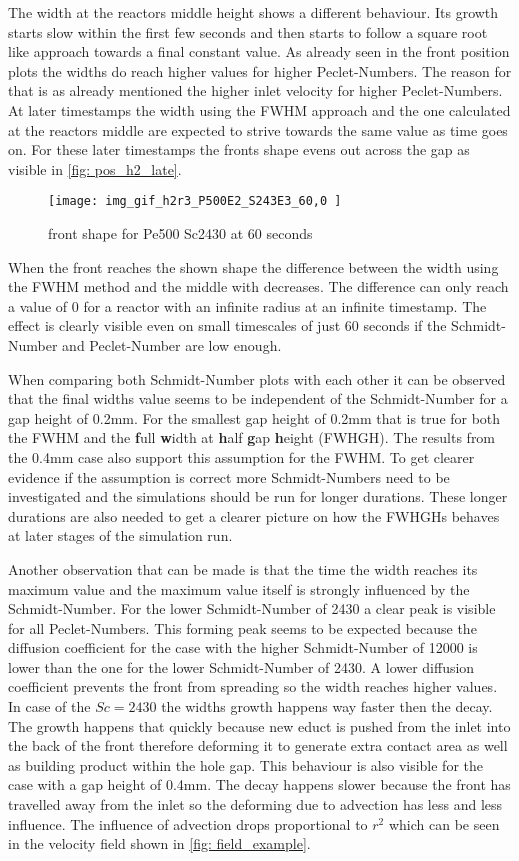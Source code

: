 \documentclass[../thesis.tex]{subfiles}
\begin{document}
The width at the reactors middle height shows a different behaviour. Its growth starts slow within the first few seconds and then starts to follow a square root like approach towards a final constant value. As already seen in the front position plots the widths do reach higher values for higher Peclet-Numbers. The reason for that is as already mentioned the higher inlet velocity for higher Peclet-Numbers. At later timestamps the width using the FWHM approach and the one calculated at the reactors middle are expected to strive towards the same value as time goes on. For these later timestamps the fronts shape evens out across the gap as visible in \autoref{fig: pos_h2_late}.
\begin{figure}[htb]
	\centering
	\texttt{[image: img\_gif\_h2r3\_P500E2\_S243E3\_60,0 ]}
	\caption{front shape for Pe500 Sc2430 at 60 seconds}
	\label{fig: pos_h2_late}
\end{figure}
When the front reaches the shown shape the difference between the width using the FWHM method and the middle with decreases. The difference can only reach a value of 0 for a reactor with an infinite radius at an infinite timestamp. The effect is clearly visible even on small timescales of just 60 seconds if the Schmidt-Number and Peclet-Number are low enough.

When comparing both Schmidt-Number plots with each other it can be observed that the final widths value seems to be independent of the Schmidt-Number for a gap height of 0.2mm. For the smallest gap height of 0.2mm that is true for both the FWHM and the \textbf{f}ull \textbf{w}idth at \textbf{h}alf \textbf{g}ap \textbf{h}eight (FWHGH). The results from the 0.4mm case also support this assumption for the FWHM. To get clearer evidence if the assumption is correct more Schmidt-Numbers need to be investigated and the simulations should be run for longer durations. These longer durations are also needed to get a clearer picture on how the FWHGHs behaves at later stages of the simulation run.

Another observation that can be made is that the time the width reaches its maximum value and the maximum value itself is strongly influenced by the Schmidt-Number. For the lower Schmidt-Number of 2430 a clear peak is visible for all Peclet-Numbers. This forming peak seems to be expected because the diffusion coefficient for the case with the higher Schmidt-Number of 12000 is lower than the one for the lower Schmidt-Number of 2430. A lower diffusion coefficient prevents the front from spreading so the width reaches higher values. In case of the $Sc = 2430$ the widths growth happens way faster then the decay. The growth happens that quickly because new educt is pushed from the inlet into the back of the front therefore deforming it to generate extra contact area as well as building product within the hole gap. This behaviour is also visible for the case with a gap height of 0.4mm. The decay happens slower because the front has travelled away from the inlet so the deforming due to advection has less and less influence. The influence of advection drops proportional to $r^2$ which can be seen in the velocity field shown in \autoref{fig: field_example}.
\newline
\end{document}
